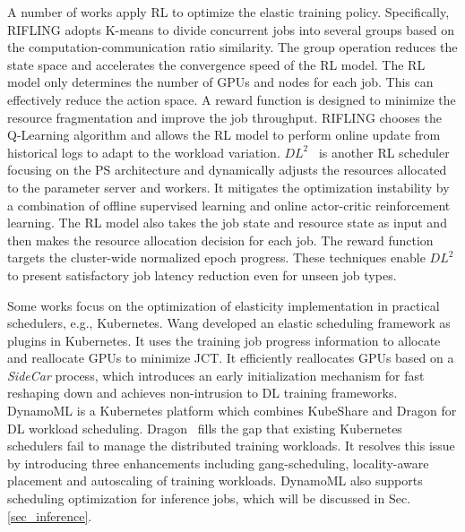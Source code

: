 A number of works apply RL to optimize the elastic training policy. Specifically, RIFLING \cite{RIFLING} adopts K-means to divide concurrent jobs into several groups based on the computation-communication ratio similarity. The group operation reduces the state space and accelerates the convergence speed of the RL model. The RL model only determines the number of GPUs and nodes for each job. This can effectively reduce the action space. A reward function is designed to minimize the resource fragmentation and improve the job throughput. RIFLING chooses the Q-Learning algorithm and allows the RL model to perform online update from historical logs to adapt to the workload variation. $DL^2$~\cite{DL2} is another RL scheduler focusing on the PS architecture and dynamically adjusts the resources allocated to the parameter server and workers. It mitigates the optimization instability by a combination of offline supervised learning and online actor-critic reinforcement learning. The RL model also takes the job state and resource state as input and then makes the resource allocation decision for each job.
The reward function targets the cluster-wide normalized epoch progress.
These techniques enable $DL^2$ to present satisfactory job latency reduction even for unseen job types.


Some works focus on the optimization of elasticity implementation in practical schedulers, e.g., Kubernetes. Wang \etal \cite{NonIntrusive} developed an elastic scheduling framework as plugins in Kubernetes. It uses the training job progress information to allocate and reallocate GPUs to minimize JCT.
It efficiently reallocates GPUs based on a \emph{SideCar} process, which introduces an early initialization mechanism for fast reshaping down and achieves non-intrusion to DL training frameworks.
DynamoML \cite{DynamoML} is a Kubernetes platform which combines KubeShare \cite{KubeShare} and Dragon \cite{Dragon} for DL workload scheduling. Dragon~\cite{Dragon} fills the gap that existing Kubernetes schedulers fail to manage the distributed training workloads. It resolves this issue by introducing three enhancements including gang-scheduling, locality-aware placement and autoscaling of training workloads. DynamoML also supports scheduling optimization for inference jobs, which will be discussed in Sec. \ref{sec_inference}.

